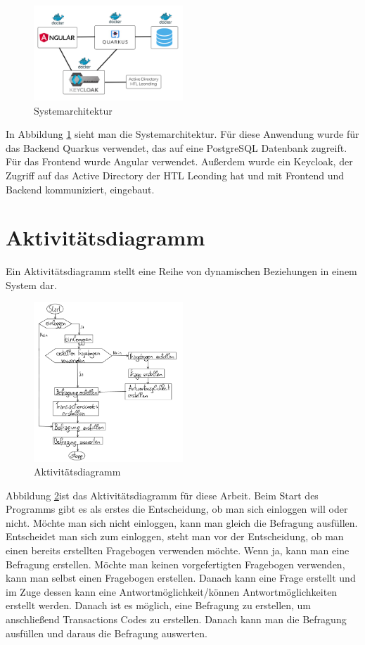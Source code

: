 \begin{figure}[!htb]
    \includegraphics[width=0.5\textwidth]{pics/Systemarchitektur.png}
    \centering
    \caption{Systemarchitektur}
    \label{fig:systemarchitektur}
\end{figure}
In Abbildung \ref{fig:systemarchitektur} sieht man die Systemarchitektur.
Für diese Anwendung wurde für das Backend Quarkus verwendet, das auf eine PostgreSQL Datenbank zugreift.
Für das Frontend wurde Angular verwendet. Außerdem wurde ein Keycloak, der Zugriff auf das Active 
Directory der HTL Leonding hat und mit Frontend und Backend kommuniziert, eingebaut.

\section{Aktivitätsdiagramm}
Ein Aktivitätsdiagramm stellt eine Reihe von dynamischen Beziehungen in einem System dar.

\begin{figure}[!htb]
    \includegraphics[width=0.5\textwidth]{pics/flussdiagramm.png}
    \centering
    \caption{Aktivitätsdiagramm}
    \label{fig:aktivitaetsdiagramm}
\end{figure}
Abbildung \ref{fig:aktivitaetsdiagramm}ist das Aktivitätsdiagramm für diese Arbeit.
Beim Start des Programms gibt es als erstes die Entscheidung, ob man sich einloggen will oder nicht. 
Möchte man sich nicht einloggen, kann man gleich die Befragung ausfüllen. Entscheidet man sich zum 
einloggen, steht man vor der Entscheidung, ob man einen bereits erstellten Fragebogen
verwenden möchte. Wenn ja, kann man eine Befragung erstellen. Möchte man keinen vorgefertigten Fragebogen 
verwenden, kann man selbst einen Fragebogen erstellen. Danach kann eine Frage erstellt und im Zuge 
dessen kann eine Antwortmöglichkeit/können Antwortmöglichkeiten erstellt werden. Danach ist es möglich, eine Befragung zu 
erstellen, um anschließend Transactions Codes zu erstellen. Danach kann man die Befragung 
ausfüllen und daraus die Befragung auswerten.

